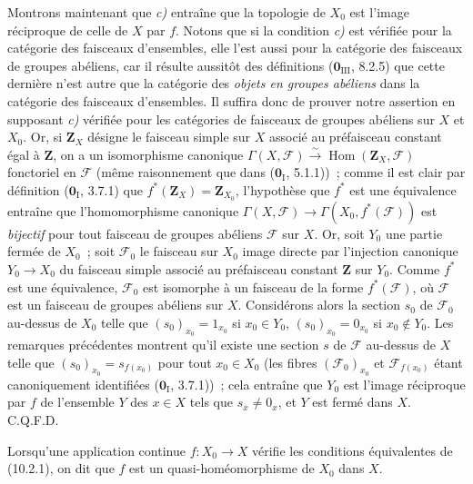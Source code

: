 Montrons maintenant que \emph{c)} entraîne que la topologie de $X_0$ est
l'image réciproque de celle de $X$ par $f$. Notons que si la condition
\emph{c)} est vérifiée pour la catégorie des faisceaux d'ensembles, elle l'est
aussi pour la catégorie des faisceaux de groupes abéliens, car il résulte
aussitôt des définitions ($\mathbf 0_{\mathrm{III}}$, 8.2.5) que cette dernière
n'est autre que la catégorie des \emph{objets en groupes abéliens} dans la
catégorie des faisceaux d'ensembles. Il suffira donc de prouver notre assertion
en supposant \emph{c)} vérifiée pour les catégories de faisceaux de groupes
abéliens sur $X$ et $X_0$. Or, si $\mathbf Z_X$ désigne le faisceau simple sur
$X$ associé au préfaisceau constant égal à $\mathbf Z$, on a un isomorphisme
canonique
$\Gamma(X,\mathcal F)\xrightarrow{\sim}\operatorname{Hom}(\mathbf Z_X,\mathcal F)$
fonctoriel en $\mathcal F$ (même raisonnement que dans
($\mathbf 0_{\mathrm I}$, 5.1.1))~; comme il est clair par définition
($\mathbf 0_{\mathrm I}$, 3.7.1) que $f^*(\mathbf Z_X)=\mathbf Z_{X_0}$,
l'hypothèse que $f^*$ est une équivalence entraîne que l'homomorphisme
canonique $\Gamma(X,\mathcal F)\to\Gamma(X_0,f^*(\mathcal F))$ est
\emph{bijectif} pour tout faisceau de groupes abéliens $\mathcal F$ sur $X$.
Or, soit $Y_0$ une partie fermée de $X_0$~; soit $\mathcal F_0$ le faisceau
sur $X_0$ image directe par l'injection canonique $Y_0\to X_0$ du faisceau
simple associé au préfaisceau constant $\mathbf Z$ sur $Y_0$. Comme $f^*$ est
une équivalence, $\mathcal F_0$ est isomorphe à un faisceau de la forme
$f^*(\mathcal F)$, où $\mathcal F$ est un faisceau de groupes abéliens sur
$X$. Considérons alors la section $s_0$ de $\mathcal F_0$ au-dessus de $X_0$
telle que $(s_0)_{x_0}=1_{x_0}$ si $x_0\in Y_0$,
$(s_0)_{x_0}=0_{x_0}$ si $x_0\notin Y_0$. Les remarques précédentes montrent
qu'il existe une section $s$ de $\mathcal F$ au-dessus de $X$ telle que
$(s_0)_{x_0}=s_{f(x_0)}$ pour tout $x_0\in X_0$ (les fibres
$(\mathcal F_0)_{x_0}$ et $\mathcal F_{f(x_0)}$ étant canoniquement
identifiées ($\mathbf 0_{\mathrm I}$, 3.7.1))~; cela entraîne que $Y_0$ est
l'image réciproque par $f$ de l'ensemble $Y$ des $x\in X$ tels que
$s_x\neq0_x$, et $Y$ est fermé dans $X$. C.Q.F.D.

\begin{definition}[10.2.2]
\label{IV.10.2.2-fr}
Lorsqu'une application continue $f:X_0\to X$ vérifie les conditions
équivalentes de \textup{(10.2.1)}, on dit que $f$ est un quasi-homéomorphisme de
$X_0$ dans $X$.
\end{definition}

